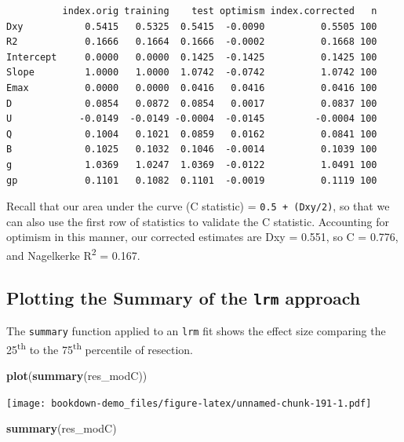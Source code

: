 \documentclass[]{book}
\newenvironment{Shaded}{\begin{snugshade}}{\end{snugshade}}
\newcommand{\KeywordTok}[1]{\textcolor[rgb]{0.13,0.29,0.53}{\textbf{#1}}}
\newcommand{\NormalTok}[1]{#1}
\theoremstyle{definition}
\theoremstyle{definition}
\theoremstyle{definition}
\theoremstyle{remark}
\begin{document}
\begin{verbatim}
          index.orig training    test optimism index.corrected   n
Dxy           0.5415   0.5325  0.5415  -0.0090          0.5505 100
R2            0.1666   0.1664  0.1666  -0.0002          0.1668 100
Intercept     0.0000   0.0000  0.1425  -0.1425          0.1425 100
Slope         1.0000   1.0000  1.0742  -0.0742          1.0742 100
Emax          0.0000   0.0000  0.0416   0.0416          0.0416 100
D             0.0854   0.0872  0.0854   0.0017          0.0837 100
U            -0.0149  -0.0149 -0.0004  -0.0145         -0.0004 100
Q             0.1004   0.1021  0.0859   0.0162          0.0841 100
B             0.1025   0.1032  0.1046  -0.0014          0.1039 100
g             1.0369   1.0247  1.0369  -0.0122          1.0491 100
gp            0.1101   0.1082  0.1101  -0.0019          0.1119 100
\end{verbatim}

Recall that our area under the curve (C statistic) =
\texttt{0.5\ +\ (Dxy/2)}, so that we can also use the first row of
statistics to validate the C statistic. Accounting for optimism in this
manner, our corrected estimates are Dxy = 0.551, so C = 0.776, and
Nagelkerke R\textsuperscript{2} = 0.167.

\subsection{\texorpdfstring{Plotting the Summary of the \texttt{lrm}
approach}{Plotting the Summary of the lrm approach}}\label{plotting-the-summary-of-the-lrm-approach}

The \texttt{summary} function applied to an \texttt{lrm} fit shows the
effect size comparing the 25\textsuperscript{th} to the
75\textsuperscript{th} percentile of resection.

\begin{Shaded}
\begin{Highlighting}[]
\KeywordTok{plot}\NormalTok{(}\KeywordTok{summary}\NormalTok{(res_modC))}
\end{Highlighting}
\end{Shaded}

\texttt{[image: bookdown-demo\_files/figure-latex/unnamed-chunk-191-1.pdf]}

\begin{Shaded}
\begin{Highlighting}[]
\KeywordTok{summary}\NormalTok{(res_modC)}
\end{Highlighting}
\end{Shaded}
\end{document}
